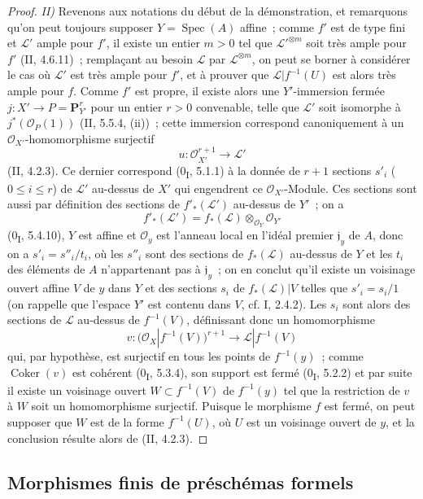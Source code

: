 \begin{proof}
\noindent\textit{II)} Revenons aux notations du début de la démonstration,
et remarquons qu'on peut toujours supposer $Y=\operatorname{Spec}(A)$
affine~; comme $f'$ est de type fini et $\mathcal L'$ ample pour $f'$, il
existe un entier $m>0$ tel que $\mathcal L'^{\otimes m}$ soit très ample pour
$f'$ (II, 4.6.11)~; remplaçant au besoin $\mathcal L$ par
$\mathcal L^{\otimes m}$, on peut se borner à considérer le cas où
$\mathcal L'$ est très ample pour $f'$, et à prouver que
$\mathcal L|f^{-1}(U)$ est alors très ample pour $f$. Comme $f'$ est propre,
il existe alors une $Y'$-immersion fermée
$j:X'\to P=\mathbf P_{Y'}^r$ pour un entier $r>0$ convenable, telle que
$\mathcal L'$ soit isomorphe à $j^*(\mathcal O_P(1))$ (II, 5.5.4, (ii))~;
cette immersion correspond canoniquement à un $\mathcal O_{X'}$-homomorphisme
surjectif
\[
u:\mathcal O_{X'}^{r+1}\longrightarrow\mathcal L'
\]
(II, 4.2.3). Ce dernier correspond (0\textsubscript{I}, 5.1.1) à la donnée
de $r+1$ sections $s'_i$ ($0\leq i\leq r$) de $\mathcal L'$ au-dessus de
$X'$ qui engendrent ce $\mathcal O_{X'}$-Module. Ces sections sont aussi par
définition des sections de $f'_*(\mathcal L')$ au-dessus de $Y'$~; on a
\[
f'_*(\mathcal L')=f_*(\mathcal L)\otimes_{\mathcal O_Y}\mathcal O_{Y'}
\]
(0\textsubscript{I}, 5.4.10), $Y$ est affine et $\mathcal O_y$ est l'anneau
local en l'idéal premier $\mathfrak j_y$ de $A$, donc on a
$s'_i=s''_i/t_i$, où les $s''_i$ sont des sections de $f_*(\mathcal L)$
au-dessus de $Y$ et les $t_i$ des éléments de $A$ n'appartenant pas à
$\mathfrak j_y$~; on en conclut qu'il existe un voisinage ouvert affine $V$
de $y$ dans $Y$ et des sections $s_i$ de $f_*(\mathcal L)|V$ telles que
$s'_i=s_i/1$ (on rappelle que l'espace $Y'$ est contenu dans $V$, cf. I,
2.4.2). Les $s_i$ sont alors des sections de $\mathcal L$ au-dessus de
$f^{-1}(V)$, définissant donc un homomorphisme
\[
v:\bigl(\mathcal O_X|f^{-1}(V)\bigr)^{r+1}
\longrightarrow\mathcal L|f^{-1}(V)
\]
qui, par hypothèse, est surjectif en tous les points de $f^{-1}(y)$~; comme
$\operatorname{Coker}(v)$ est cohérent (0\textsubscript{I}, 5.3.4), son
support est fermé (0\textsubscript{I}, 5.2.2) et par suite il existe un
voisinage ouvert $W\subset f^{-1}(V)$ de $f^{-1}(y)$ tel que la restriction
de $v$ à $W$ soit un homomorphisme surjectif. Puisque le morphisme $f$ est
fermé, on peut supposer que $W$ est de la forme $f^{-1}(U)$, où $U$ est un
voisinage ouvert de $y$, et la conclusion résulte alors de (II, 4.2.3).
\end{proof}

\subsection{Morphismes finis de préschémas formels}


